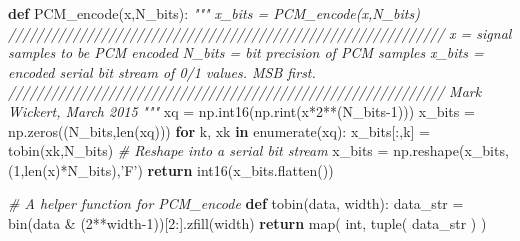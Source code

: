 \documentclass[11pt]{article}
\newenvironment{Shaded}{}{}
\newcommand{\KeywordTok}[1]{\textcolor[rgb]{0.00,0.44,0.13}{\textbf{{#1}}}}
\newcommand{\DecValTok}[1]{\textcolor[rgb]{0.25,0.63,0.44}{{#1}}}
\newcommand{\StringTok}[1]{\textcolor[rgb]{0.25,0.44,0.63}{{#1}}}
\newcommand{\CommentTok}[1]{\textcolor[rgb]{0.38,0.63,0.69}{\textit{{#1}}}}
\newcommand{\NormalTok}[1]{{#1}}
\newcommand{\ControlFlowTok}[1]{\textcolor[rgb]{0.00,0.44,0.13}{\textbf{{#1}}}}
\newcommand{\OperatorTok}[1]{\textcolor[rgb]{0.40,0.40,0.40}{{#1}}}
\newcommand{\BuiltInTok}[1]{{#1}}
\begin{document}
\begin{Shaded}
\begin{Highlighting}[]
\KeywordTok{def}\NormalTok{ PCM_encode(x,N_bits):}
    \CommentTok{"""}
\CommentTok{    x_bits = PCM_encode(x,N_bits)}
\CommentTok{    /////////////////////////////////////////////////////////////}
\CommentTok{         x = signal samples to be PCM encoded}
\CommentTok{    N_bits = bit precision of PCM samples}
\CommentTok{    x_bits = encoded serial bit stream of 0/1 values. MSB first.}
\CommentTok{    /////////////////////////////////////////////////////////////}
\CommentTok{    Mark Wickert, March 2015}
\CommentTok{    """}
\NormalTok{    xq }\OperatorTok{=}\NormalTok{ np.int16(np.rint(x}\OperatorTok{*}\DecValTok{2}\OperatorTok{**}\NormalTok{(N_bits}\OperatorTok{-}\DecValTok{1}\NormalTok{)))}
\NormalTok{    x_bits }\OperatorTok{=}\NormalTok{ np.zeros((N_bits,}\BuiltInTok{len}\NormalTok{(xq)))}
    \ControlFlowTok{for}\NormalTok{ k, xk }\KeywordTok{in} \BuiltInTok{enumerate}\NormalTok{(xq):}
\NormalTok{        x_bits[:,k] }\OperatorTok{=}\NormalTok{ tobin(xk,N_bits)}
    \CommentTok{# Reshape into a serial bit stream}
\NormalTok{    x_bits }\OperatorTok{=}\NormalTok{ np.reshape(x_bits,(}\DecValTok{1}\NormalTok{,}\BuiltInTok{len}\NormalTok{(x)}\OperatorTok{*}\NormalTok{N_bits),}\StringTok{'F'}\NormalTok{)}
    \ControlFlowTok{return}\NormalTok{ int16(x_bits.flatten())}


\CommentTok{# A helper function for PCM_encode}
\KeywordTok{def}\NormalTok{ tobin(data, width):}
\NormalTok{    data_str }\OperatorTok{=} \BuiltInTok{bin}\NormalTok{(data }\OperatorTok{&}\NormalTok{ (}\DecValTok{2}\OperatorTok{**}\NormalTok{width}\OperatorTok{-}\DecValTok{1}\NormalTok{))[}\DecValTok{2}\NormalTok{:].zfill(width)}
    \ControlFlowTok{return} \BuiltInTok{map}\NormalTok{( }\BuiltInTok{int}\NormalTok{, }\BuiltInTok{tuple}\NormalTok{( data_str ) )}
    

\end{Highlighting}
\end{Shaded}
\end{document}
